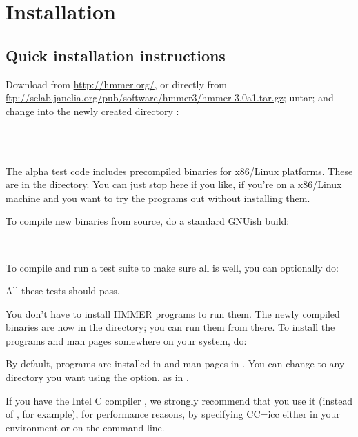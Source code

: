 \section{Installation}
\label{section:installation}

\subsection{Quick installation instructions}

Download  from
\url{http://hmmer.org/}, or directly from
\url{ftp://selab.janelia.org/pub/software/hmmer3/hmmer-3.0a1.tar.gz};
untar; and change into the newly created directory :

\\
\\

The alpha test code includes precompiled binaries for x86/Linux
platforms. These are in the  directory. You can just
stop here if you like, if you're on a x86/Linux machine and you want
to try the programs out without installing them.

To compile new binaries from source, do a standard GNUish build:

\\ 

To compile and run a test suite to make sure all is well, you can
optionally do:


All these tests should pass.

You don't have to install HMMER programs to run them. The newly
compiled binaries are now in the  directory; you can run
them from there. To install the programs and man pages somewhere on
your system, do:


By default, programs are installed in  and man
pages in . You can change 
to any directory you want using the 
option, as in .

If you have the Intel C compiler , we strongly recommend
that you use it (instead of , for example), for performance
reasons, by specifying {CC=icc} either in your environment or on the
 command line. 

